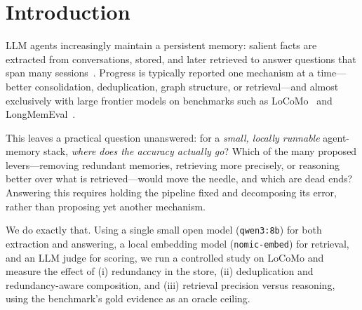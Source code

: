 \section{Introduction}

LLM agents increasingly maintain a persistent memory: salient facts are
extracted from conversations, stored, and later retrieved to answer questions
that span many sessions~\cite{packer2023memgpt,chhikara2025mem0,xu2025amem}.
Progress is typically reported one mechanism at a time---better
consolidation, deduplication, graph structure, or retrieval---and almost
exclusively with large frontier models on benchmarks such as
LoCoMo~\cite{maharana2024locomo} and LongMemEval~\cite{wu2024longmemeval}.

This leaves a practical question unanswered: for a \emph{small, locally
runnable} agent-memory stack, \emph{where does the accuracy actually go}? Which
of the many proposed levers---removing redundant memories, retrieving more
precisely, or reasoning better over what is retrieved---would move the needle,
and which are dead ends? Answering this requires holding the pipeline fixed and
decomposing its error, rather than proposing yet another mechanism.

We do exactly that. Using a single small open model (\texttt{qwen3:8b}) for both
extraction and answering, a local embedding model (\texttt{nomic-embed}) for
retrieval, and an LLM judge for scoring, we run a controlled study on LoCoMo and
measure the effect of (i) redundancy in the store, (ii) deduplication and
redundancy-aware composition, and (iii) retrieval precision versus reasoning,
using the benchmark's gold evidence as an oracle ceiling.

